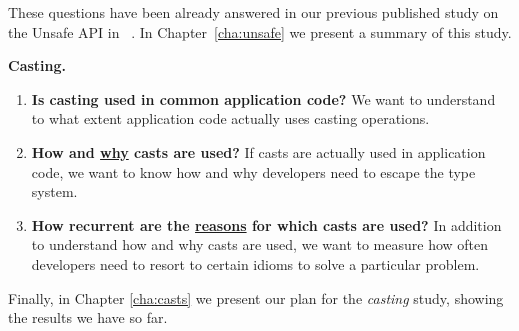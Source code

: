 These questions have been already answered in our previous published study on the Unsafe API in \java{}~\cite{mastrangeloUseYourOwn2015}.
In Chapter~\ref{cha:unsafe} we present a summary of this study.

\textbf{ Casting.}
\begin{enumerate}[label=$CRQ\arabic*:$,ref=$CRQ\arabic*$,leftmargin=3.4\parindent]
\item\label{casts:rq1}
{\bf Is casting used in common application code?}
We want to understand to what extent application code actually uses casting operations.

\item\label{casts:rq2}
{\bf How and \underline{why} casts are used?}
If casts are actually used in application code,
we want to know how and why developers need to escape the type system.

\item\label{casts:rq3}
{\bf How recurrent are the \underline{reasons}  for which casts are used?}
In addition to understand how and why casts are used,
we want to measure how often developers need to resort to certain idioms to solve a particular problem.
\end{enumerate}



Finally, in Chapter \ref{cha:casts} we present our
 plan for the \emph{casting} study, showing the results we have so far.

